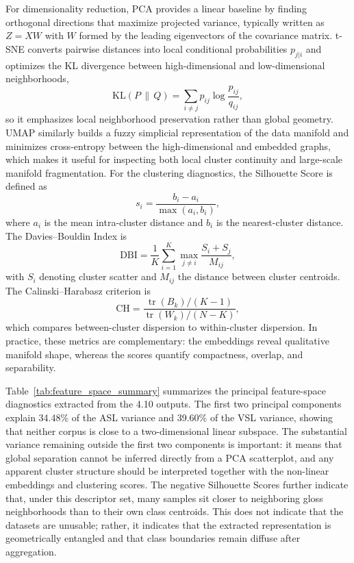 \documentclass{ieeeaccess}
\begin{document}
For dimensionality reduction, PCA provides a linear baseline by finding orthogonal directions that maximize projected variance, typically written as $Z = XW$ with $W$ formed by the leading eigenvectors of the covariance matrix. t-SNE converts pairwise distances into local conditional probabilities $p_{j|i}$ and optimizes the KL divergence between high-dimensional and low-dimensional neighborhoods,
\begin{equation}
\mathrm{KL}(P\,\|\,Q) = \sum_{i \ne j} p_{ij} \log \frac{p_{ij}}{q_{ij}},
\end{equation}
so it emphasizes local neighborhood preservation rather than global geometry. UMAP similarly builds a fuzzy simplicial representation of the data manifold and minimizes cross-entropy between the high-dimensional and embedded graphs, which makes it useful for inspecting both local cluster continuity and large-scale manifold fragmentation. For the clustering diagnostics, the Silhouette Score is defined as
\begin{equation}
s_i = \frac{b_i - a_i}{\max(a_i, b_i)},
\end{equation}
where $a_i$ is the mean intra-cluster distance and $b_i$ is the nearest-cluster distance. The Davies--Bouldin Index is
\begin{equation}
\mathrm{DBI} = \frac{1}{K} \sum_{i=1}^{K} \max_{j \ne i} \frac{S_i + S_j}{M_{ij}},
\end{equation}
with $S_i$ denoting cluster scatter and $M_{ij}$ the distance between cluster centroids. The Calinski--Harabasz criterion is
\begin{equation}
\mathrm{CH} = \frac{\operatorname{tr}(B_k)/(K-1)}{\operatorname{tr}(W_k)/(N-K)},
\end{equation}
which compares between-cluster dispersion to within-cluster dispersion. In practice, these metrics are complementary: the embeddings reveal qualitative manifold shape, whereas the scores quantify compactness, overlap, and separability.

Table~\ref{tab:feature_space_summary} summarizes the principal feature-space diagnostics extracted from the 4.10 outputs. The first two principal components explain 34.48\% of the ASL variance and 39.60\% of the VSL variance, showing that neither corpus is close to a two-dimensional linear subspace. The substantial variance remaining outside the first two components is important: it means that global separation cannot be inferred directly from a PCA scatterplot, and any apparent cluster structure should be interpreted together with the non-linear embeddings and clustering scores. The negative Silhouette Scores further indicate that, under this descriptor set, many samples sit closer to neighboring gloss neighborhoods than to their own class centroids. This does not indicate that the datasets are unusable; rather, it indicates that the extracted representation is geometrically entangled and that class boundaries remain diffuse after aggregation.
\end{document}
